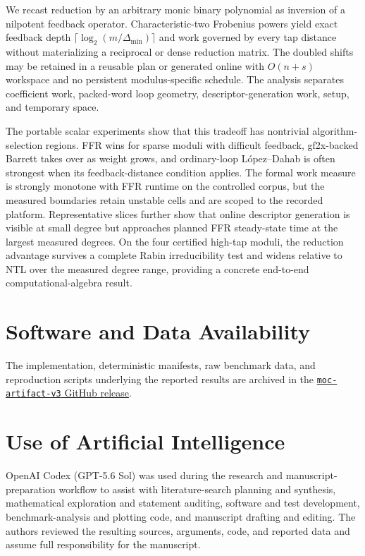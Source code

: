 \documentclass{mcom-l}
\numberwithin{equation}{section}
\theoremstyle{definition}
\theoremstyle{remark}
\newcommand{\Dmin}{\Delta_{\min}}
\begin{document}
We recast reduction by an arbitrary monic binary polynomial as inversion of a
nilpotent feedback operator.  Characteristic-two Frobenius powers yield exact
feedback depth $\lceil\log_2(m/\Dmin)\rceil$ and work governed by every tap
distance without materializing a reciprocal or dense reduction matrix.  The
doubled shifts may be retained in a reusable plan or generated online with
$O(n+s)$ workspace and no persistent modulus-specific schedule.  The analysis
separates coefficient work, packed-word loop geometry, descriptor-generation
work, setup, and temporary space.

The portable scalar experiments show that this tradeoff has nontrivial
algorithm-selection regions.  FFR wins for sparse moduli with
difficult feedback, gf2x-backed Barrett takes over as weight grows, and
ordinary-loop L\'opez--Dahab is often strongest when its feedback-distance
condition applies.  The formal work measure is strongly monotone with FFR
runtime on the controlled corpus, but the measured boundaries retain unstable
cells and are scoped to the recorded platform.  Representative slices further
show that online descriptor generation is
visible at small degree but approaches planned FFR steady-state time at the
largest measured degrees.  On the four certified high-tap moduli,
the reduction advantage survives a complete Rabin irreducibility test and
widens relative to NTL over the measured degree range, providing a concrete
end-to-end computational-algebra result.

\section*{Software and Data Availability}
The implementation, deterministic manifests, raw benchmark data, and
reproduction scripts underlying the reported results are archived in the
\href{https://github.com/junyu33/ExSuwako/releases/tag/moc-artifact-v3}
{\texttt{moc-artifact-v3} GitHub release}.

\section*{Use of Artificial Intelligence}
OpenAI Codex (GPT-5.6 Sol) was used during the research and manuscript-preparation
workflow to assist with literature-search planning and synthesis,
mathematical exploration and statement auditing, software and test
development, benchmark-analysis and plotting code, and manuscript drafting
and editing.  The authors reviewed the resulting sources, arguments, code, and
reported data and assume full responsibility for the manuscript.
\end{document}
